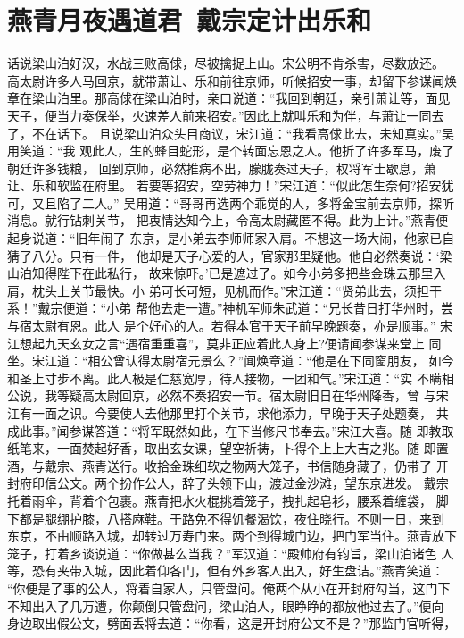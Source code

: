 \chapter{燕青月夜遇道君~戴宗定计出乐和}

话说梁山泊好汉，水战三败高俅，尽被擒捉上山。宋公明不肯杀害，尽数放还。
高太尉许多人马回京，就带萧让、乐和前往京师，听候招安一事，却留下参谋闻焕
章在梁山泊里。那高俅在梁山泊时，亲口说道：“我回到朝廷，亲引萧让等，面见
天子，便当力奏保举，火速差人前来招安。”因此上就叫乐和为伴，与萧让一同去
了，不在话下。
且说梁山泊众头目商议，宋江道：“我看高俅此去，未知真实。”吴用笑道：“我
观此人，生的蜂目蛇形，是个转面忘恩之人。他折了许多军马，废了朝廷许多钱粮，
回到京师，必然推病不出，朦胧奏过天子，权将军士歇息，萧让、乐和软监在府里。
若要等招安，空劳神力！”宋江道：“似此怎生奈何?招安犹可，又且陷了二人。”
吴用道：“哥哥再选两个乖觉的人，多将金宝前去京师，探听消息。就行钻刺关节，
把衷情达知今上，令高太尉藏匿不得。此为上计。”燕青便起身说道：“旧年闹了
东京，是小弟去李师师家入肩。不想这一场大闹，他家已自猜了八分。只有一件，
他却是天子心爱的人，官家那里疑他。他自必然奏说：‘梁山泊知得陛下在此私行，
故来惊吓。’已是遮过了。如今小弟多把些金珠去那里入肩，枕头上关节最快。小
弟可长可短，见机而作。”宋江道：“贤弟此去，须担干系！”戴宗便道：“小弟
帮他去走一遭。”神机军师朱武道：“兄长昔日打华州时，尝与宿太尉有恩。此人
是个好心的人。若得本官于天子前早晚题奏，亦是顺事。”
宋江想起九天玄女之言“遇宿重重喜”，莫非正应着此人身上?便请闻参谋来堂上
同坐。宋江道：“相公曾认得太尉宿元景么？”闻焕章道：“他是在下同窗朋友，
如今和圣上寸步不离。此人极是仁慈宽厚，待人接物，一团和气。”宋江道：“实
不瞒相公说，我等疑高太尉回京，必然不奏招安一节。宿太尉旧日在华州降香，曾
与宋江有一面之识。今要使人去他那里打个关节，求他添力，早晚于天子处题奏，
共成此事。”闻参谋答道：“将军既然如此，在下当修尺书奉去。”宋江大喜。随
即教取纸笔来，一面焚起好香，取出玄女课，望空祈祷，卜得个上上大吉之兆。随
即置酒，与戴宗、燕青送行。收拾金珠细软之物两大笼子，书信随身藏了，仍带了
开封府印信公文。两个扮作公人，辞了头领下山，渡过金沙滩，望东京进发。
戴宗托着雨伞，背着个包裹。燕青把水火棍挑着笼子，拽扎起皂衫，腰系着缠袋，
脚下都是腿绷护膝，八搭麻鞋。于路免不得饥餐渴饮，夜住晓行。不则一日，来到
东京，不由顺路入城，却转过万寿门来。两个到得城门边，把门军当住。燕青放下
笼子，打着乡谈说道：“你做甚么当我？”军汉道：“殿帅府有钧旨，梁山泊诸色
人等，恐有夹带入城，因此着仰各门，但有外乡客人出入，好生盘诘。”燕青笑道：
“你便是了事的公人，将着自家人，只管盘问。俺两个从小在开封府勾当，这门下
不知出入了几万遭，你颠倒只管盘问，梁山泊人，眼睁睁的都放他过去了。”便向
身边取出假公文，劈面丢将去道：“你看，这是开封府公文不是？”那监门官听得，
